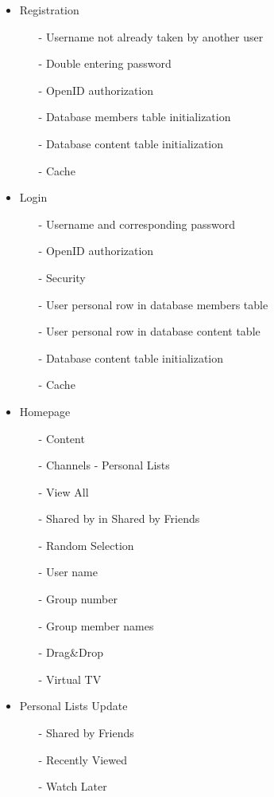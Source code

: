\documentclass{acm_proc_article-sp}
\begin{document}
\begin{itemize}
  \item Registration 
  \begin{itemize}
  	\item [-]Username not already taken by another user
  	\item [-]Double entering password
  	\item [-]OpenID authorization
  	\item [-]Database members table initialization
  	\item [-]Database content table initialization
  	\item [-]Cache
  \end{itemize}
  \item Login
  \begin{itemize}
  	\item [-]Username and corresponding password
  	\item [-]OpenID authorization
  	\item [-]Security
  	\item [-]User personal row in database members table
  	\item [-]User personal row in database content table
  	\item [-]Database content table initialization
  	\item [-]Cache
  \end{itemize}
  \item Homepage 
  \begin{itemize}
  	\item [-]Content
  	\item [-]Channels - Personal Lists
  	\item [-]View All
  	\item [-]Shared by in Shared by Friends
  	\item [-]Random Selection
  	\item [-]User name
  	\item [-]Group number
  	\item [-]Group member names
  	\item [-]Drag\&Drop
  	\item [-]Virtual TV
  \end{itemize}
  \item Personal Lists Update
  \begin{itemize}
  	\item [-]Shared by Friends
  	\item [-]Recently Viewed
  	\item [-]Watch Later

\end{itemize}
\end{itemize}
\end{document}
